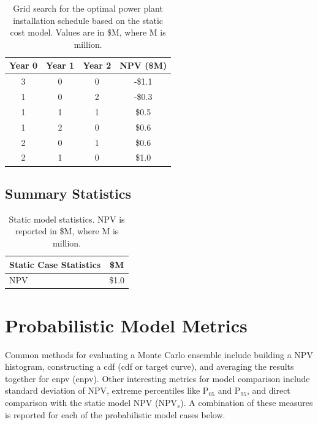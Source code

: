 \begin{table}[!htp]%
\centering
\begin{tabular}{|c|c|c|c|}
\hline
\textbf{Year 0} & \textbf{Year 1} & \textbf{Year 2} & \textbf{NPV (\$M)} \\ \hline
3 & 0 & 0 & -\$1.1 \\ \hline
1 & 0 & 2 & -\$0.3 \\ \hline
1 & 1 & 1 & \$0.5 \\ \hline
1 & 2 & 0 & \$0.6 \\ \hline
2 & 0 & 1 & \$0.6 \\ \hline
2 & 1 & 0 & \$1.0 \\ \hline
\end{tabular}
\caption[Static model module installation schedule]{Grid search for the optimal power plant installation schedule based on the static cost model. Values are in \$M, where M is million.}
\label{tab:static_optimization}
\end{table}

\subsection{Summary Statistics}
\label{ch6:static_stats}

\begin{table}[!htp]
\centering
\begin{tabular}{|l|c|}
\hline
\textbf{Static Case Statistics} & \textbf{\$M} \\ \hline
NPV & \$1.0 \\ \hline
\end{tabular}
\caption[Static model statistics]{Static model statistics. NPV is reported in \$M, where M is million.}
\label{tab:static_mod_stats}
\end{table}

\section{Probabilistic Model Metrics}

Common methods for evaluating a Monte Carlo ensemble include building a NPV histogram, constructing a \acrlong{cdf} (\acrshort{cdf} or target curve), and averaging the results together for \acrlong{enpv} (\acrshort{enpv}). Other interesting metrics for model comparison include standard deviation of NPV, extreme percentiles like P$_{05}$ and P$_{95}$, and direct comparison with the static model NPV (NPV$_{s}$). A combination of these measures is reported for each of the probabilistic model cases below.

